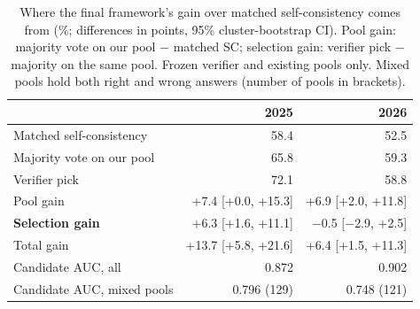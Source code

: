 \begin{table}[!t]
\centering
\scriptsize
\caption{Where the final framework's gain over matched self-consistency comes from (\%; differences in points, 95\% cluster-bootstrap CI). Pool gain: majority vote on our pool $-$ matched SC; selection gain: verifier pick $-$ majority on the same pool. Frozen verifier and existing pools only. Mixed pools hold both right and wrong answers (number of pools in brackets).}
\label{tab:v4bdecomp}
\setlength{\tabcolsep}{2.5pt}
\begin{tabular}{lrr}
\toprule
 & 2025 & 2026 \\
\midrule
Matched self-consistency & 58.4 & 52.5 \\
Majority vote on our pool & 65.8 & 59.3 \\
Verifier pick & 72.1 & 58.8 \\
\midrule
Pool gain & +7.4 [+0.0, +15.3] & +6.9 [+2.0, +11.8] \\
\textbf{Selection gain} & +6.3 [+1.6, +11.1] & $-$0.5 [$-$2.9, +2.5] \\
Total gain & +13.7 [+5.8, +21.6] & +6.4 [+1.5, +11.3] \\
\midrule
Candidate AUC, all & 0.872 & 0.902 \\
Candidate AUC, mixed pools & 0.796 (129) & 0.748 (121) \\
\bottomrule
\end{tabular}
\end{table}
